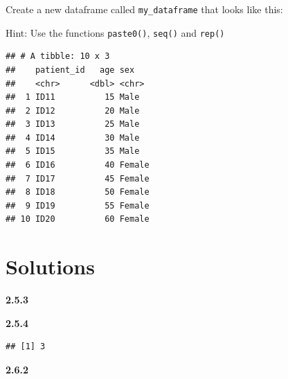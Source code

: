 \documentclass[12pt,]{krantz}
\makeatletter
\newenvironment{Shaded}{\begin{snugshade}}{\end{snugshade}}
\newcommand{\DecValTok}[1]{\textcolor[rgb]{0.00,0.00,0.81}{#1}}
\newcommand{\KeywordTok}[1]{\textcolor[rgb]{0.13,0.29,0.53}{\textbf{#1}}}
\newcommand{\NormalTok}[1]{#1}
\newcommand{\OperatorTok}[1]{\textcolor[rgb]{0.81,0.36,0.00}{\textbf{#1}}}
\newcommand{\StringTok}[1]{\textcolor[rgb]{0.31,0.60,0.02}{#1}}
\newenvironment{kframe}{%
\medskip{}
\setlength{\fboxsep}{.8em}
 \def\at@end@of@kframe{}%
 \ifinner\ifhmode%
  \def\at@end@of@kframe{\end{minipage}}%
  \begin{minipage}{\columnwidth}%
 \fi\fi%
 \def\FrameCommand##1{\hskip\@totalleftmargin \hskip-\fboxsep
 \colorbox{shadecolor}{##1}\hskip-\fboxsep
     \hskip-\linewidth \hskip-\@totalleftmargin \hskip\columnwidth}%
 \MakeFramed {\advance\hsize-\width
   \@totalleftmargin\z@ \linewidth\hsize
   \@setminipage}}%
 {\par\unskip\endMakeFramed%
 \at@end@of@kframe}
\renewenvironment{Shaded}{\begin{kframe}}{\end{kframe}}
\theoremstyle{definition}
\theoremstyle{definition}
\theoremstyle{definition}
\theoremstyle{remark}
\makeatother
\begin{document}
Create a new dataframe called \texttt{my\_dataframe} that looks like
this:

Hint: Use the functions \texttt{paste0()}, \texttt{seq()} and
\texttt{rep()}

\begin{verbatim}
## # A tibble: 10 x 3
##    patient_id   age sex   
##    <chr>      <dbl> <chr> 
##  1 ID11          15 Male  
##  2 ID12          20 Male  
##  3 ID13          25 Male  
##  4 ID14          30 Male  
##  5 ID15          35 Male  
##  6 ID16          40 Female
##  7 ID17          45 Female
##  8 ID18          50 Female
##  9 ID19          55 Female
## 10 ID20          60 Female
\end{verbatim}

\hypertarget{solutions-1}{%
\section{Solutions}\label{solutions-1}}

\textbf{2.5.3}

\begin{Shaded}
\end{Shaded}

\textbf{2.5.4}

\begin{Shaded}
\end{Shaded}

\begin{verbatim}
## [1] 3
\end{verbatim}

\textbf{2.6.2}

\begin{Shaded}
\end{Shaded}
\end{document}
